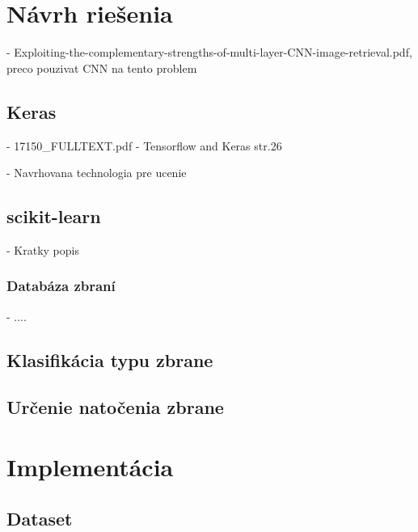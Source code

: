 \documentclass[10pt,a4paper]{article}
\begin{document}
\section{Návrh riešenia}

- Exploiting-the-complementary-strengths-of-multi-layer-CNN-image-retrieval.pdf,
preco pouzivat CNN na tento problem

\subsection{Keras}
- 17150\_FULLTEXT.pdf - Tensorflow and Keras str.26

- Navrhovana technologia pre ucenie

\subsection{scikit-learn}
- Kratky popis

\subsubsection{Databáza zbraní}
- ....

\subsection{Klasifikácia typu zbrane}

\subsection{Určenie natočenia zbrane}


\pagebreak
\section{Implementácia}

\subsection{Dataset}



\pagebreak
\renewcommand\refname{Odkazy}

\end{document}
